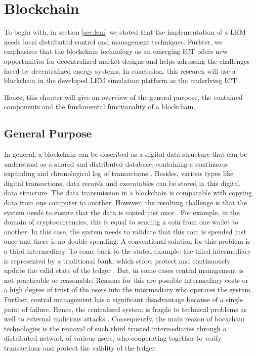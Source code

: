 \section{Blockchain}
\label{sec:about_blockchain}

To begin with, in section \ref{sec:lem} we stated that the implementation of a LEM
needs local distributed control and management techniques. Furhter, we emphasises
that the blockchain technology as an emerging ICT offers new opportunities for decentralized
market designs and helps adressing the challenges faced by decentralized energy systems. 
In conclusion, this research will use a blockchain in the developed LEM simulation platform 
as the underlying ICT. 

Hence, this chapter will give an overview of the general purpose, 
the contained components and the fundamental functionality of a blockchain. 

\subsection{General Purpose}
In general, a blockchain can be described as a digital data structure that can be understand as a shared and distributed database, containing a continuous expanding and chronological log of transactions . Besides, various types like digital transactions, data records and executables can be stored in this digital data structure. The data transmission in a blockchain is comparable with copying data from one computer to another. However, the resulting challenge is that the system needs to ensure that the data is copied just once . For example, in the domain of cryptocurrencies, this is equal to sending a coin from one wallet to another. In this case, the system needs to validate that this coin is spended just once and there is no double-spending. A conventional solution for this problem is a third intermediary. To come back to the stated example, the third intermediary is represented by a traditional bank, which store, protect and continuously update the valid state of the ledger . But, in some cases central management is not practicable or reasonable. Reasons for this are possible intermediary costs or a high degree of trust of the users into the intermediary who operates the system. Further, central management has a significant disadvantage because of a single point of failure. Hence, the centralized system is fragile to technical problems as well to external malicious attacks .
Consequently, the main reason of bockchain technologies is the removal of such third trusted intermediaries through a distributed network of various users, who cooperating together to verify transactions and protect the validity of the ledger

